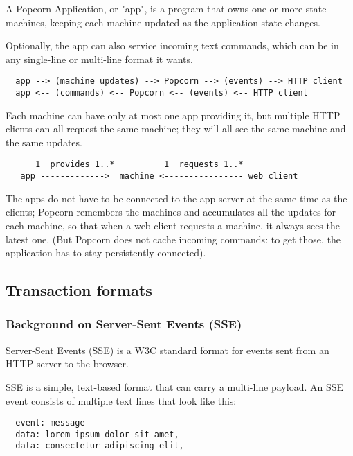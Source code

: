 \documentclass[12pt]{article}
\begin{document}
A Popcorn Application, or "app", is a program that owns one or more
state machines, keeping each machine updated as the application state
changes.

Optionally, the app can also service incoming text commands, which can
be in any single-line or multi-line format it wants.

\begin{verbatim}
  app --> (machine updates) --> Popcorn --> (events) --> HTTP client
  app <-- (commands) <-- Popcorn <-- (events) <-- HTTP client
\end{verbatim}

Each machine can have only at most one app providing it, but
multiple HTTP clients can all request the same machine; they will
all see the same machine and the same updates.

\begin{verbatim}
      1  provides 1..*          1  requests 1..*
   app ------------->  machine <---------------- web client
\end{verbatim}

The apps do not have to be connected to the app-server at the same
time as the clients; Popcorn remembers the machines and accumulates
all the updates for each machine, so that when a web client requests a
machine, it always sees the latest one. (But Popcorn does not cache
incoming commands: to get those, the application has to stay
persistently connected).

\subsection{Transaction formats}

\subsubsection{Background on Server-Sent Events (SSE)}

Server-Sent Events (SSE) is a W3C standard format for events sent
from an HTTP server to the browser.

SSE is a simple, text-based format that can carry a multi-line
payload. An SSE event consists of multiple text lines that look like
this:

\begin{verbatim}
  event: message
  data: lorem ipsum dolor sit amet,
  data: consectetur adipiscing elit,

\end{verbatim}
\end{document}
